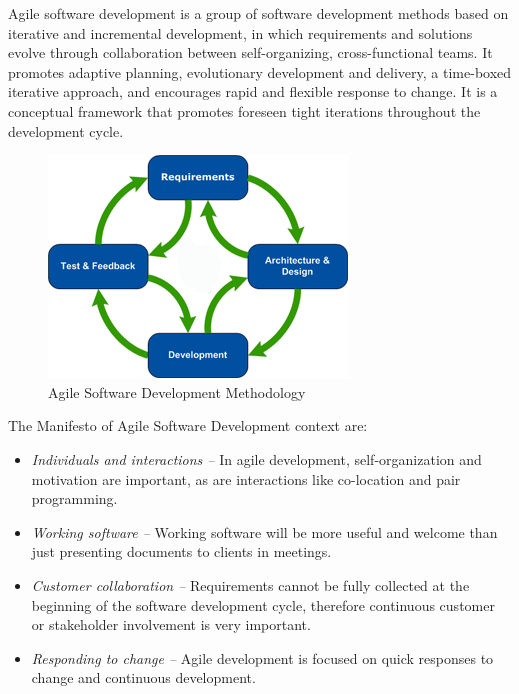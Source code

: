 Agile software development is a group of software development methods based on iterative and incremental development, in which requirements and solutions evolve through collaboration between self-organizing, cross-functional teams. It promotes adaptive planning, evolutionary development and delivery, a time-boxed iterative approach, and encourages rapid and flexible response to change. It is a conceptual framework that promotes foreseen tight iterations throughout the development cycle.\\
\begin{figure}[H]
\centering \includegraphics[scale=0.9]{image/agile.png}
\caption{Agile Software Development Methodology}
\end{figure}


The Manifesto of Agile Software Development context are:
\begin{itemize}
\item \emph{Individuals and interactions –} In agile development, self-organization and motivation are important, as are interactions like co-location and pair programming.
\item \emph{Working software –} Working software will be more useful and welcome than just presenting documents to clients in meetings.
\item \emph{Customer collaboration –} Requirements cannot be fully collected at the beginning of the software development cycle, therefore continuous customer or stakeholder involvement is very important.
\item \emph{Responding to change –} Agile development is focused on quick responses to change and continuous development.
\end{itemize}
